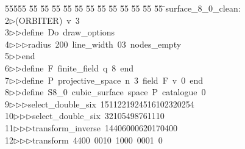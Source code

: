 %
%
\begin{tabbing}
55555 \= 55 \= 55 \= 55 \= 55 \= 55 \= 55 \= 55 \= 55 \= 55 \= 55 \= 55 \= 55 \= \>surface\_8\_0\_clean:\\[0pt]
2\>$\triangleright$\>(ORBITER)\ v\ 3\ \\[0pt]
3\>$\triangleright$\>$\triangleright$\>define\ Do\ draw\_options\ \\[0pt]
4\>$\triangleright$\>$\triangleright$\>$\triangleright$\>radius\ 200\ line\_width\ 03\ nodes\_empty\ \\[0pt]
5\>$\triangleright$\>$\triangleright$\>end\ \\[0pt]
6\>$\triangleright$\>$\triangleright$\>define\ F\ finite\_field\ q\ 8\ end\ \\[0pt]
7\>$\triangleright$\>$\triangleright$\>define\ P\ projective\_space\ n\ 3\ field\ F\ v\ 0\ end\ \\[0pt]
8\>$\triangleright$\>$\triangleright$\>define\ S8\_0\ cubic\_surface\ space\ P\ catalogue\ 0\ \\[0pt]
9\>$\triangleright$\>$\triangleright$\>$\triangleright$\>select\_double\_six\ 1511221924516102320254\ \\[0pt]
10\>$\triangleright$\>$\triangleright$\>$\triangleright$\>select\_double\_six\ 32105498761110\ \\[0pt]
11\>$\triangleright$\>$\triangleright$\>$\triangleright$\>transform\_inverse\ 14406000620170400\ \\[0pt]
12\>$\triangleright$\>$\triangleright$\>$\triangleright$\>transform\ 4400\ 0010\ 1000\ 0001\ 0\ \\[0pt]

\end{tabbing}
